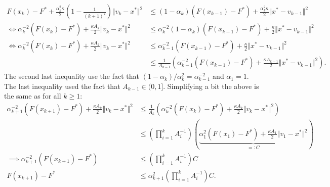 \documentclass[12pt]{article}
\begin{document}
        {\footnotesize
        \begin{align*}
            F(x_k) - F^* +
            \frac{\alpha_k^2\kappa}{2}\left(
                1 - \frac{1}{(k + 1)^2}
            \right)
            \Vert v_k - x^*\Vert^2
            &\le 
            (1 - \alpha_k)(F(x_{k - 1}) - F^*)
            + 
            \frac{\alpha_k^2\kappa}{2}
            \Vert x^* - v_{k - 1}\Vert^2
            \\
            \iff 
            \alpha_k^{-2}(F(x_k) - F^*)
            + 
            \frac{\kappa A_k}{2}\Vert v_k - x^*\Vert^2
            &\le 
            \alpha_k^{-2}(1 - \alpha_k)(F(x_{k - 1}) - F^*)
            + 
            \frac{\kappa}{2}
            \Vert x^* - v_{k - 1}\Vert^2
            \\
            \iff
            \alpha_k^{-2}(F(x_k) - F^*)
            + 
            \frac{\kappa A_k}{2}\Vert v_k - x^*\Vert^2
            &\le 
            \alpha_{k - 1}^{-2}(F(x_{k - 1}) - F^*)
            + 
            \frac{\kappa}{2}
            \Vert x^* - v_{k - 1}\Vert^2
            \\
            & \le 
            \frac{1}{A_{k - 1}}\left(
                \alpha_{k - 1}^{-2}(F(x_{k - 1}) - F^*)
                + 
                \frac{\kappa A_{k - 1}}{2}
                \Vert x^* - v_{k - 1}\Vert^2
            \right). 
        \end{align*}
        }
        The second last inequality use the fact that $(1 - \alpha_k)/\alpha_k^2 = \alpha_{k - 1}^{-2}$ and $\alpha_1 = 1$. 
        The last inequality used the fact that $A_{k - 1} \in (0, 1]$. 
        Simplifying a bit the above is the same as for all $k\ge 1$: 
        \begin{align*}
            \alpha_{k + 1}^{-2}(F(x_{k + 1}) - F^*) 
            + \frac{\kappa A_k}{2}\Vert v_k - x^*\Vert^2
            &\le 
            \frac{1}{A_k}\left(
                \alpha_k^{-2}(F(x_k) - F^*) + \frac{\kappa A_k}{2}\Vert v_{k} - x^*\Vert^2
            \right)
            \\
            & \le
            \left(
                \prod_{i = 1}^k A_i^{-1}
            \right)\left(
                \underbrace{
                    \alpha_1^2 (F(x_1) - F^*) + \frac{\kappa A_1}{2}\Vert v_1 - x^*\Vert^2
                }
                _{=:C}
            \right)
            \\
            \implies 
            \alpha_{k + 1}^{-2}(F(x_{k + 1}) - F^*)
            &\le 
            \left(
                \prod_{i = 1}^k A_i^{-1}
            \right) C
            \\
            F(x_{k + 1}) - F^* 
            &\le 
            \alpha_{k + 1}^2\left(
                \prod_{i = 1}^k A_i^{-1}
            \right) C. 
        \end{align*}
\end{document}
